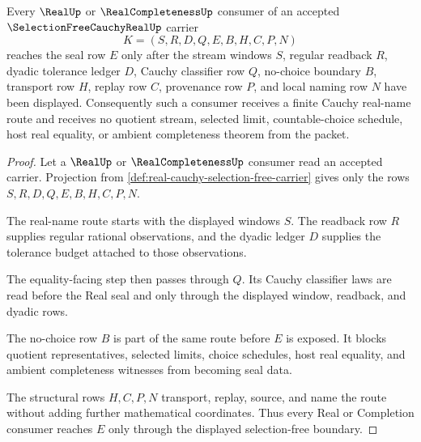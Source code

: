 \begin{theorem}
\label{thm:real-cauchy-selection-free-seal-boundary}
Every $\RealUp$ or $\RealCompletenessUp$ consumer of an accepted $\SelectionFreeCauchyRealUp$ carrier
$$
K=(S,R,D,Q,E,B,H,C,P,N)
$$
reaches the seal row $E$ only after the stream windows $S$, regular readback $R$, dyadic tolerance ledger $D$, Cauchy classifier row $Q$, no-choice boundary $B$, transport row $H$, replay row $C$, provenance row $P$, and local naming row $N$ have been displayed. Consequently such a consumer receives a finite Cauchy real-name route and receives no quotient stream, selected limit, countable-choice schedule, host real equality, or ambient completeness theorem from the packet.
\end{theorem}
\begin{proof}
Let a $\RealUp$ or $\RealCompletenessUp$ consumer read an accepted carrier. Projection from \autoref{def:real-cauchy-selection-free-carrier} gives only the rows $S,R,D,Q,E,B,H,C,P,N$.

The real-name route starts with the displayed windows $S$. The readback row $R$ supplies regular rational observations, and the dyadic ledger $D$ supplies the tolerance budget attached to those observations.

The equality-facing step then passes through $Q$. Its Cauchy classifier laws are read before the Real seal and only through the displayed window, readback, and dyadic rows.

The no-choice row $B$ is part of the same route before $E$ is exposed. It blocks quotient representatives, selected limits, choice schedules, host real equality, and ambient completeness witnesses from becoming seal data.

The structural rows $H,C,P,N$ transport, replay, source, and name the route without adding further mathematical coordinates. Thus every Real or Completion consumer reaches $E$ only through the displayed selection-free boundary.
\end{proof}

